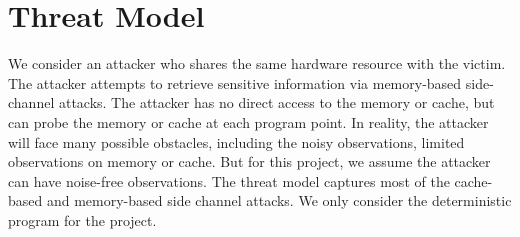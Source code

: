 \section{Threat Model}
We consider an attacker who shares the same hardware resource with the victim. 
The attacker attempts to retrieve sensitive information via memory-based side-channel attacks. 
The attacker has no direct access to the memory or cache, but can probe the memory 
or cache at each program point. In reality, the attacker will face many possible obstacles,
including the noisy observations, limited observations on memory or cache.
But for this project, we assume the attacker can have noise-free observations. 
The threat model captures most of the cache-based and memory-based side channel attacks.
We only consider the deterministic program for the project.
